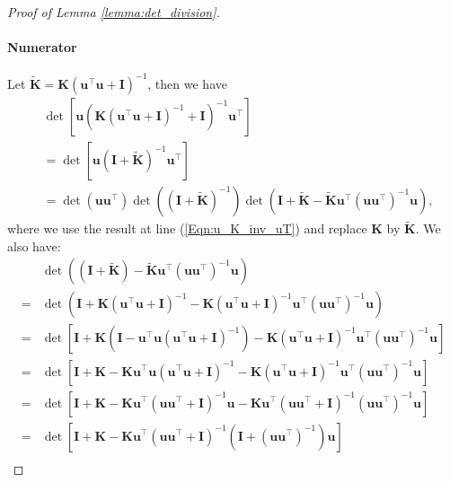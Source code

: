 \begin{proof}[Proof of Lemma \ref{lemma:det_division}]
\paragraph{Numerator}
Let $\widetilde{\mathbf{K}} = \mathbf{K} (\mathbf{u}^\top \mathbf{u} + \mathbf{I})^{-1}$, then we have
\begin{align}
    &\det [\mathbf{u}\left(\mathbf{K}(\mathbf{u}^\top\mathbf{u}+\mathbf{I})^{-1} + \mathbf{I}\right)^{-1}\mathbf{u}^\top] 
    \\
    &= \det [\mathbf{u}\left( \mathbf{I}+\widetilde{\mathbf{K}} \right)^{-1}\mathbf{u}^\top] \\
    & = \det (\mathbf{u} \mathbf{u}^\top) \det \left((\mathbf{I}+\widetilde{\mathbf{K}})^{-1}\right) \det \left( \mathbf{I} + \widetilde{\mathbf{K}} - \widetilde{\mathbf{K}}\mathbf{u}^\top (\mathbf{u} \mathbf{u}^\top)^{-1} \mathbf{u}\right),
\end{align}
where we use the result at line  (\ref{Eqn:u_K_inv_uT}) and replace $\mathbf{K}$ by $\widetilde{\mathbf{K}}$. We also have: 
\begin{align}
    &\det \left( (\mathbf{I} + \widetilde{\mathbf{K}}) - \widetilde{\mathbf{K}}\mathbf{u}^\top (\mathbf{u} \mathbf{u}^\top)^{-1} \mathbf{u}\right) \\
    = &\det \left( \mathbf{I} + \mathbf{K} (\mathbf{u}^\top \mathbf{u} + \mathbf{I})^{-1} - \mathbf{K} (\mathbf{u}^\top \mathbf{u} + \mathbf{I})^{-1}\mathbf{u}^\top (\mathbf{u} \mathbf{u}^\top)^{-1} \mathbf{u}\right) \\
    = &  \det \left[ \mathbf{I} + \mathbf{K} \left( \mathbf{I} - \mathbf{u}^\top \mathbf{u} (\mathbf{u}^\top \mathbf{u} + \mathbf{I})^{-1} \right) - \mathbf{K} (\mathbf{u}^\top \mathbf{u} + \mathbf{I})^{-1}\mathbf{u}^\top (\mathbf{u} \mathbf{u}^\top)^{-1} \mathbf{u}\right] \\
    = &  \det \left[ \mathbf{I} + \mathbf{K} - \mathbf{K} \mathbf{u}^\top \mathbf{u} (\mathbf{u}^\top \mathbf{u} + \mathbf{I})^{-1}  - \mathbf{K} (\mathbf{u}^\top \mathbf{u} + \mathbf{I})^{-1}\mathbf{u}^\top (\mathbf{u} \mathbf{u}^\top)^{-1} \mathbf{u}\right] \\
    = &  \det \left[ \mathbf{I} + \mathbf{K} - \mathbf{K} \mathbf{u}^\top (\mathbf{u} \mathbf{u}^\top + \mathbf{I})^{-1}\mathbf{u}  - \mathbf{K} \mathbf{u}^\top ( \mathbf{u}\mathbf{u}^\top + \mathbf{I})^{-1} (\mathbf{u} \mathbf{u}^\top)^{-1} \mathbf{u}\right] \\ 
    = &  \det \left[ \mathbf{I} + \mathbf{K} - \mathbf{K} \mathbf{u}^\top (\mathbf{u} \mathbf{u}^\top + \mathbf{I})^{-1} \left( \mathbf{I} + (\mathbf{u} \mathbf{u}^\top)^{-1} \right)  \mathbf{u} \right] \\ 

\end{align}
\end{proof}
